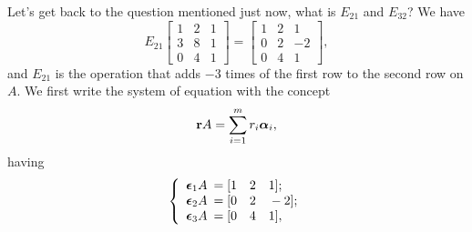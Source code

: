 \documentclass[11pt]{article}
\theoremstyle{break}
\theoremstyle{no_label}
\newcommand{\bfr}{\textbf{r}}
\newcommand{\bfalpha}{\text{\boldmath$\alpha$}}
\newcommand{\bfepsilon}{\text{\boldmath$\epsilon$}}
\numberwithin{equation}{section}
\begin{document}
Let's get back to the question mentioned just now, what is $E_{21}$ and $E_{32}$? We have $$E_{21}\begin{bmatrix}
    1 & 2 & 1 \\
    3 & 8 & 1 \\
    0 & 4 & 1
\end{bmatrix}=\begin{bmatrix}
    1 & 2 & 1 \\
    0 & 2 & -2 \\
    0 & 4 & 1
\end{bmatrix},$$ and $E_{21}$ is the operation that adds $-3$ times of the first row to the second row on $A$. We first write the system of equation with the concept $$\bfr A=\sum_{i=1}^{m}r_i\bfalpha_i,$$ having 
\begin{equation*}
    \left\{\begin{array}{rl}
        \bfepsilon_1 A \!\!\!&= [1\quad 2\quad 1];\\
        \bfepsilon_2 A \!\!\!&= [0\quad 2\quad -2];\\
        \bfepsilon_3 A \!\!\!&= [0\quad 4\quad 1],
    \end{array}\right.
\end{equation*}
\end{document}
